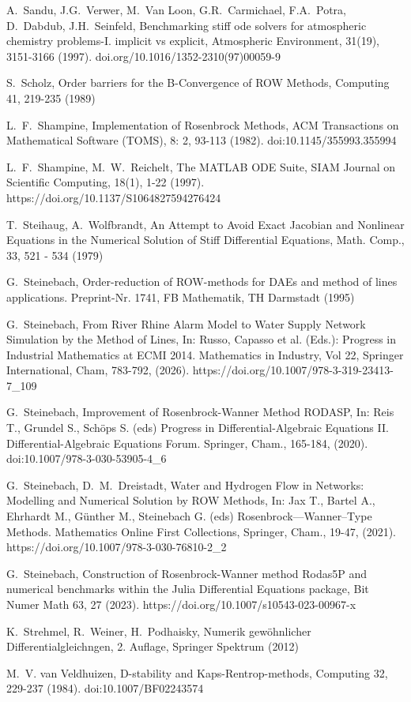 \documentclass{juliacon}
\begin{document}
\begin{thebibliography}{}
 A.~Sandu, J.G.~Verwer, M.~Van Loon, G.R.~Carmichael, F.A.~Potra, D.~Dabdub, J.H.~Seinfeld,
Benchmarking stiff ode solvers for atmospheric chemistry problems-I. implicit vs explicit,
Atmospheric Environment, 31(19), 3151-3166 (1997). 
doi.org/10.1016/1352-2310(97)00059-9

 S.~Scholz, Order barriers for the B-Convergence of ROW Methods, Computing 41, 219-235 (1989)

 L.~F.~Shampine, Implementation of Rosenbrock Methods,
ACM Transactions on Mathematical Software (TOMS), 8: 2, 93-113 (1982).
doi:10.1145/355993.355994

 L.~F.~Shampine, M.~W.~Reichelt, The MATLAB ODE Suite, SIAM Journal on Scientific Computing, 18(1), 1-22 (1997).
https://doi.org/10.1137/S1064827594276424

 T.~Steihaug, A.~Wolfbrandt, An Attempt to Avoid Exact Jacobian and Nonlinear
Equations in the Numerical Solution of Stiff Differential Equations, 
Math. Comp., 33, 521 - 534 (1979)

 G.~Steinebach, Order-reduction of ROW-methods for DAEs and method of lines  applications. Preprint-Nr. 1741, FB Mathematik, TH Darmstadt (1995)

 G.~Steinebach,
From River Rhine Alarm Model to Water Supply Network Simulation by the Method of Lines,
In: Russo, Capasso et al. (Eds.): Progress in Industrial Mathematics at ECMI 2014. Mathematics in Industry, Vol 22,
Springer International, Cham, 783-792, (2026).
https://doi.org/10.1007/978-3-319-23413-7\_109 
  
 G.~Steinebach, Improvement of Rosenbrock-Wanner Method RODASP, In: Reis T., Grundel S., Schöps S. (eds) 
Progress in Differential-Algebraic Equations II. Differential-Algebraic Equations Forum. Springer, Cham., 165-184, (2020).
doi:10.1007/978-3-030-53905-4\_6 

 G.~Steinebach, D.~M.~Dreistadt,
Water and Hydrogen Flow in Networks: Modelling and Numerical Solution by ROW Methods,
In: Jax T., Bartel A., Ehrhardt M., Günther M., Steinebach G. (eds) Rosenbrock—Wanner–Type Methods. Mathematics Online First Collections,
Springer, Cham., 19-47,  (2021).
https://doi.org/10.1007/978-3-030-76810-2\_2

 G.~Steinebach, Construction of Rosenbrock-Wanner method Rodas5P and numerical benchmarks within the Julia Differential Equations package, 
Bit Numer Math 63, 27 (2023). 
https://doi.org/10.1007/s10543-023-00967-x

 K.~Strehmel, R.~Weiner, H.~Podhaisky, Numerik gewöhnlicher Differentialgleichngen, 2. Auflage, Springer Spektrum (2012)
 
 M.~V. van Veldhuizen, D-stability and Kaps-Rentrop-methods,
Computing 32, 229-237 (1984). doi:10.1007/BF02243574

\end{thebibliography}

%
\end{document}
